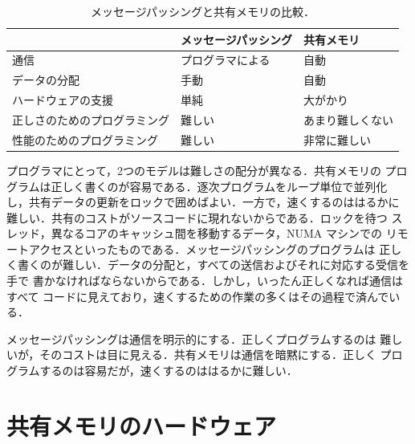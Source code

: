 \documentclass[../main.tex]{subfiles}
\begin{document}
\begin{table}[htbp]
  \centering\small
  \caption{メッセージパッシングと共有メモリの比較．}
  \label{tab:l18-mp-sm}
  \begin{tabular}{@{}lll@{}}
    \toprule
                             & メッセージパッシング & 共有メモリ \\
    \midrule
    通信                     & プログラマによる     & 自動 \\
    データの分配             & 手動                 & 自動 \\
    ハードウェアの支援       & 単純                 & 大がかり \\
    正しさのためのプログラミング & 難しい            & あまり難しくない \\
    性能のためのプログラミング   & 難しい            & 非常に難しい \\
    \bottomrule
  \end{tabular}
\end{table}

プログラマにとって，2つのモデルは難しさの配分が異なる．共有メモリの
プログラムは正しく書くのが容易である．逐次プログラムをループ単位で並列化
し，共有データの更新をロックで囲めばよい．一方で，速くするのははるかに
難しい．共有のコストがソースコードに現れないからである．ロックを待つ
スレッド，異なるコアのキャッシュ間を移動するデータ，NUMA マシンでの
リモートアクセスといったものである．メッセージパッシングのプログラムは
正しく書くのが難しい．データの分配と，すべての送信およびそれに対応する受信を手で
書かなければならないからである．しかし，いったん正しくなれば通信はすべて
コードに見えており，速くするための作業の多くはその過程で済んでいる．

\begin{keypoint}
  メッセージパッシングは通信を明示的にする．正しくプログラムするのは
  難しいが，そのコストは目に見える．共有メモリは通信を暗黙にする．正しく
  プログラムするのは容易だが，速くするのははるかに難しい．
\end{keypoint}

\section{共有メモリのハードウェア}
\label{sec:l18-mt-hardware}
\end{document}
